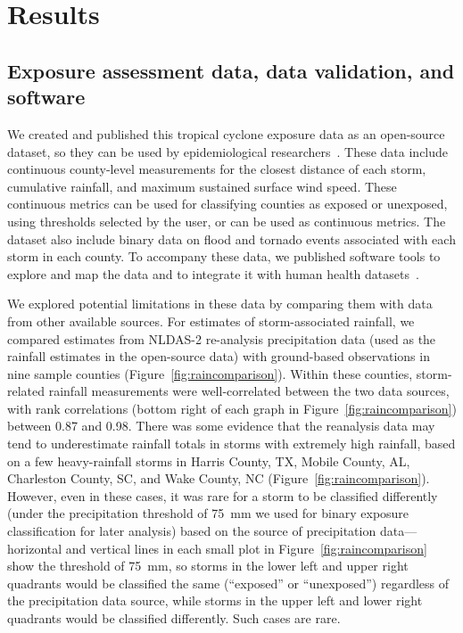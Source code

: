 \section*{Results}

\subsection*{Exposure assessment data, data validation, and software}

We created and published this tropical cyclone exposure data as an open-source
dataset, so they can be used by epidemiological
researchers~\parencite{hurricaneexposuredata}. These data include continuous
county-level measurements for the closest distance of each storm, cumulative
rainfall, and maximum sustained surface wind speed. These continuous metrics
can be used for classifying counties as exposed or unexposed, using thresholds
selected by the user, or can be used as continuous metrics. The dataset also
include binary data on flood and tornado events associated with each storm in
each county. To accompany these data, we published software tools to explore
and map the data and to integrate it with human health
datasets~\parencite{hurricaneexposure}. 

We explored potential limitations in these data by comparing them with data
from other available sources.  For estimates of storm-associated rainfall, we
compared estimates from NLDAS-2 re-analysis precipitation data (used as the
rainfall estimates in the open-source data) with ground-based observations in
nine sample counties (Figure~\ref{fig:raincomparison}). Within these counties,
storm-related rainfall measurements were well-correlated between the two data
sources, with rank correlations (bottom right of each graph in
Figure~\ref{fig:raincomparison}) between 0.87 and 0.98. There was some evidence
that the reanalysis data may tend to underestimate rainfall totals in storms
with extremely high rainfall, based on a few heavy-rainfall storms in Harris
County, TX, Mobile County, AL, Charleston County, SC, and Wake County, NC
(Figure~\ref{fig:raincomparison}). However, even in these cases, it was rare
for a storm to be classified differently (under the precipitation threshold
of 75~\si{\milli\metre} we used for binary exposure classification for later
analysis) based on the source of precipitation data---horizontal and vertical
lines in each small plot in Figure~\ref{fig:raincomparison} show the threshold
of 75~\si{\milli\metre}, so storms in the lower left and upper right quadrants
would be classified the same (``exposed'' or ``unexposed'') regardless of the
precipitation data source, while storms in the upper left and lower right
quadrants would be classified differently. Such cases are rare.

